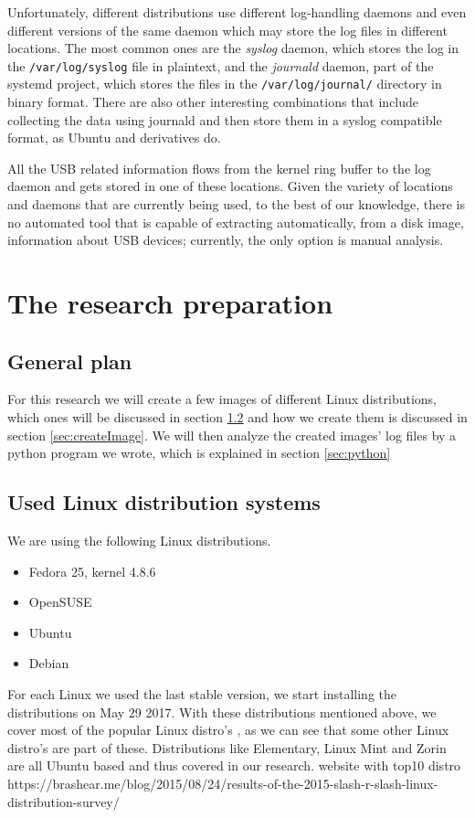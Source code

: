 \documentclass[a4paper]{article}
\begin{document}
Unfortunately, different distributions use different log-handling daemons and
even different versions of the same daemon which may store the log files in
different locations. The most common ones are the \emph{syslog} daemon, which
stores the log in the \texttt{/var/log/syslog} file in plaintext, and the
\emph{journald} daemon, part of the systemd project, which stores the files in
the \texttt{/var/log/journal/} directory in binary format. There are also other
interesting combinations that include collecting the data using journald and
then store them in a syslog compatible format, as Ubuntu and derivatives
do.~\cite{poettering2012journal}

All the USB related information flows from the kernel ring buffer to the log
daemon and gets stored in one of these locations. Given the variety of locations
and daemons that are currently being used, to the best of our knowledge, there
is no automated tool that is capable of extracting automatically, from a disk
image, information about USB devices; currently, the only option is manual
analysis.

\section{The research preparation}
\label{sec:resprep}
\subsection{General plan}
For this research we will create a few images of different Linux distributions,
which ones will be discussed in section \ref{sec:usedLinux} and how we create
them is discussed in section \ref{sec:createImage}. We will then analyze the
created images' log files by a python program we wrote, which is explained in
section \ref{sec:python}

\subsection{Used Linux distribution systems}\label{sec:usedLinux}
We are using the following Linux distributions.
\begin{itemize}
\item Fedora 25, kernel 4.8.6
\item OpenSUSE
\item Ubuntu
\item Debian
\end{itemize}
For each Linux we used the last stable version, we start installing the
distributions on May 29 2017. With these distributions mentioned above, we cover
most of the popular Linux distro's \cite{LinuxDistro}, as we can see that some
other Linux distro's are part of these. Distributions like Elementary, Linux
Mint and  Zorin are all Ubuntu based and thus covered in our research. %
website with top10 distro
https://brashear.me/blog/2015/08/24/results-of-the-2015-slash-r-slash-linux-distribution-survey/
\end{document}
